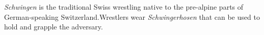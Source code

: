 \emph{Schwingen} is the traditional Swiss wrestling native to the pre-alpine parts of German-speaking Switzerland.Wrestlers wear \emph{Schwingerhosen} that can be used to hold and grapple the adversary.
